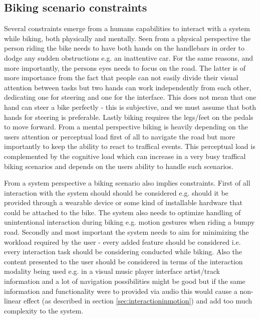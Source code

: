 \subsection{Biking scenario constraints}
Several constraints emerge from a humans capabilities to interact with a system while biking, both physically and mentally. Seen from a physical perspective the person riding the bike needs to have both hands on the handlebars in order to dodge any sudden obstructions e.g. an inattentive car. For the same reasons, and more importantly, the persons eyes needs to focus on the road. The latter is of more importance from the fact that people can not easily divide their visual attention between tasks \cite{brewster_overcoming_2002} but two hands can work independently from each other, dedicating one for steering and one for the interface. This does not mean that one hand can steer a bike perfectly - this is subjective, and we must assume that both hands for steering is preferable. Lastly biking requires the legs/feet on the pedals to move forward. From a mental perspective biking is heavily depending on the users attention or perceptual load first of all to navigate the road but more importantly to keep the ability to react to traffical events. This perceptual load is complemented by the cognitive load which can increase in a very busy traffical biking scenarios and depends on the users ability to handle such scenarios.

From a system perspective a biking scenario also implies constraints. First of all interaction with the system should should be considered e.g. should it be provided through a wearable device or some kind of installable hardware that could be attached to the bike. The system also needs to optimize handling of unintentional interaction during biking e.g. motion gestures when riding a bumpy road. Secondly and most important the system needs to aim for minimizing the workload required by the user - every added feature should be considered i.e. every interaction task should be considering conducted while biking. Also the content presented to the user should be considered in terms of the interaction modality being used e.g. in a visual music player interface artist/track information and a lot of navigation possibilities might be good but if the same information and functionality were to provided via audio this would cause a non-linear effect (as described in section \ref{sec:interactioninmotion}) and add too much complexity to the system.

